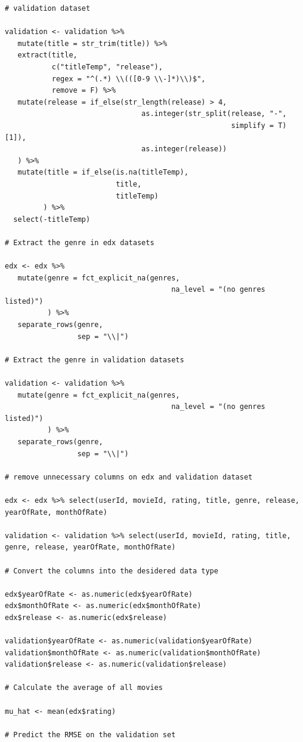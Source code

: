 \documentclass[]{article}
\begin{document}
\begin{verbatim}
# validation dataset

validation <- validation %>%
   mutate(title = str_trim(title)) %>%
   extract(title,
           c("titleTemp", "release"),
           regex = "^(.*) \\(([0-9 \\-]*)\\)$",
           remove = F) %>%
   mutate(release = if_else(str_length(release) > 4,
                                as.integer(str_split(release, "-",
                                                     simplify = T)[1]),
                                as.integer(release))
   ) %>%
   mutate(title = if_else(is.na(titleTemp),
                          title,
                          titleTemp)
         ) %>%
  select(-titleTemp)

# Extract the genre in edx datasets

edx <- edx %>%
   mutate(genre = fct_explicit_na(genres,
                                       na_level = "(no genres listed)")
          ) %>%
   separate_rows(genre,
                 sep = "\\|")

# Extract the genre in validation datasets

validation <- validation %>%
   mutate(genre = fct_explicit_na(genres,
                                       na_level = "(no genres listed)")
          ) %>%
   separate_rows(genre,
                 sep = "\\|")

# remove unnecessary columns on edx and validation dataset

edx <- edx %>% select(userId, movieId, rating, title, genre, release, yearOfRate, monthOfRate)

validation <- validation %>% select(userId, movieId, rating, title, genre, release, yearOfRate, monthOfRate)

# Convert the columns into the desidered data type

edx$yearOfRate <- as.numeric(edx$yearOfRate)
edx$monthOfRate <- as.numeric(edx$monthOfRate)
edx$release <- as.numeric(edx$release)

validation$yearOfRate <- as.numeric(validation$yearOfRate)
validation$monthOfRate <- as.numeric(validation$monthOfRate)
validation$release <- as.numeric(validation$release)

# Calculate the average of all movies

mu_hat <- mean(edx$rating)

# Predict the RMSE on the validation set


\end{verbatim}
\end{document}
